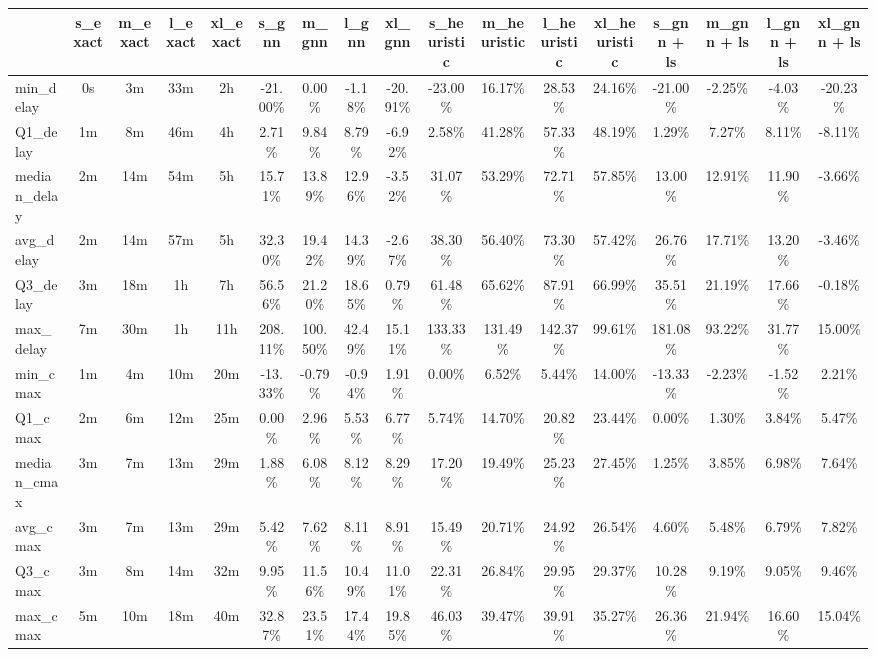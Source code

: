 \begin{tabular}{lcccccccccccccccc}
\toprule
 & s_exact & m_exact & l_exact & xl_exact & s_gnn & m_gnn & l_gnn & xl_gnn & s_heuristic & m_heuristic & l_heuristic & xl_heuristic & s_gnn + ls & m_gnn + ls & l_gnn + ls & xl_gnn + ls \\
\midrule
min_delay & 0s & 3m & 33m & 2h & -21.00\% & 0.00\% & -1.18\% & -20.91\% & -23.00\% & 16.17\% & 28.53\% & 24.16\% & -21.00\% & -2.25\% & -4.03\% & -20.23\% \\
Q1_delay & 1m & 8m & 46m & 4h & 2.71\% & 9.84\% & 8.79\% & -6.92\% & 2.58\% & 41.28\% & 57.33\% & 48.19\% & 1.29\% & 7.27\% & 8.11\% & -8.11\% \\
median_delay & 2m & 14m & 54m & 5h & 15.71\% & 13.89\% & 12.96\% & -3.52\% & 31.07\% & 53.29\% & 72.71\% & 57.85\% & 13.00\% & 12.91\% & 11.90\% & -3.66\% \\
avg_delay & 2m & 14m & 57m & 5h & 32.30\% & 19.42\% & 14.39\% & -2.67\% & 38.30\% & 56.40\% & 73.30\% & 57.42\% & 26.76\% & 17.71\% & 13.20\% & -3.46\% \\
Q3_delay & 3m & 18m & 1h & 7h & 56.56\% & 21.20\% & 18.65\% & 0.79\% & 61.48\% & 65.62\% & 87.91\% & 66.99\% & 35.51\% & 21.19\% & 17.66\% & -0.18\% \\
max_delay & 7m & 30m & 1h & 11h & 208.11\% & 100.50\% & 42.49\% & 15.11\% & 133.33\% & 131.49\% & 142.37\% & 99.61\% & 181.08\% & 93.22\% & 31.77\% & 15.00\% \\
min_cmax & 1m & 4m & 10m & 20m & -13.33\% & -0.79\% & -0.94\% & 1.91\% & 0.00\% & 6.52\% & 5.44\% & 14.00\% & -13.33\% & -2.23\% & -1.52\% & 2.21\% \\
Q1_cmax & 2m & 6m & 12m & 25m & 0.00\% & 2.96\% & 5.53\% & 6.77\% & 5.74\% & 14.70\% & 20.82\% & 23.44\% & 0.00\% & 1.30\% & 3.84\% & 5.47\% \\
median_cmax & 3m & 7m & 13m & 29m & 1.88\% & 6.08\% & 8.12\% & 8.29\% & 17.20\% & 19.49\% & 25.23\% & 27.45\% & 1.25\% & 3.85\% & 6.98\% & 7.64\% \\
avg_cmax & 3m & 7m & 13m & 29m & 5.42\% & 7.62\% & 8.11\% & 8.91\% & 15.49\% & 20.71\% & 24.92\% & 26.54\% & 4.60\% & 5.48\% & 6.79\% & 7.82\% \\
Q3_cmax & 3m & 8m & 14m & 32m & 9.95\% & 11.56\% & 10.49\% & 11.01\% & 22.31\% & 26.84\% & 29.95\% & 29.37\% & 10.28\% & 9.19\% & 9.05\% & 9.46\% \\
max_cmax & 5m & 10m & 18m & 40m & 32.87\% & 23.51\% & 17.44\% & 19.85\% & 46.03\% & 39.47\% & 39.91\% & 35.27\% & 26.36\% & 21.94\% & 16.60\% & 15.04\% \\

\end{tabular}
